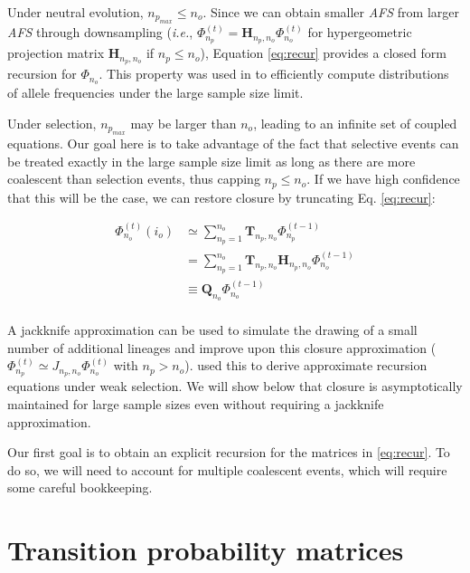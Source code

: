 \documentclass[review]{elsarticle}
\newcommand{\afs}[2]{\Phi_{#1}^{(#2)}}
\begin{document}
Under neutral evolution, $n_{p_{max}}\leq n_o$. Since we can obtain smaller \textit{AFS} from larger
\textit{AFS} through downsampling (\textit{i.e.}, $\afs{n_p}{t} = \mathbf{H}_{n_p,n_o} \afs{n_o}{t}$
for hypergeometric projection matrix $\mathbf{H}_{n_p,n_o}$ if $n_p\leq n_o$), Equation
\eqref{eq:recur} provides a closed form recursion for $\Phi_{n_o}.$ This property was used in
\cite{JouganousEtAl2017} to efficiently compute distributions of allele frequencies under the large
sample size limit.

Under selection, $n_{p_{max}}$ may be larger than $n_o$, leading to an infinite set of coupled
equations. Our goal here is to take advantage of the fact that selective events can be treated
exactly in the large sample size limit as long as there are more coalescent than selection events,
thus capping $n_p \leq n_o$. If we have high confidence that this will be the case, we can restore
closure by truncating Eq. \eqref{eq:recur}:

\begin{equation}
\begin{split}
  \afs{n_o}{t}(i_o)
  &\simeq \sum_{n_p=1}^{n_{o}} \mathbf{T}_{n_p,n_o}                      \afs{n_p}{t-1}\\
  &=      \sum_{n_p=1}^{n_{o}} \mathbf{T}_{n_p,n_o} \mathbf{H}_{n_p,n_o} \afs{n_o}{t-1}\\
  &\equiv \mathbf{Q}_{n_o}                                               \afs{n_o}{t-1}\\
\end{split}
\label{eq:truncated}
\end{equation}

A jackknife approximation can be used to simulate the drawing of a small number of additional
lineages and improve upon this closure approximation ($\afs{n_p}{t} \simeq J_{n_p,n_o} \afs{n_o}{t}$
with $n_p>n_o$). \cite{JouganousEtAl2017} used this to derive approximate recursion equations under
weak selection. We will show below that closure is asymptotically maintained for large sample sizes
even without requiring a jackknife approximation.

Our first goal is to obtain an explicit recursion for the matrices in \eqref{eq:recur}. To do so, we
will need to account for multiple coalescent events, which will require some careful bookkeeping.

\section{Transition probability matrices}
\label{sec:trans-mat}
\end{document}

